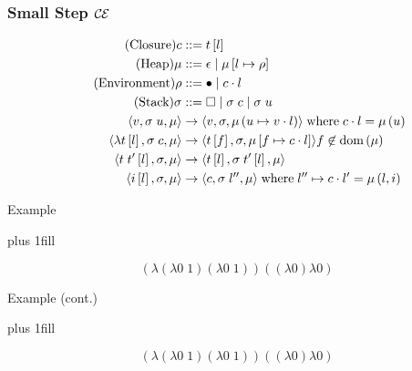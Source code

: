 \documentclass[14pt]{beamer}
\def\ce{$\mathcal{\mathcal{C} \mskip -1mu \mathcal{E}} \mskip 4mu$}
\begin{document}
\begin{frame}[fragile]
\frametitle{Small Step \ce}
\footnotesize
\begin{align*}
\tag{Closure} c &::= t \left[l\right] \\
\tag{Heap} \mu &::= \epsilon \; | \; \mu \left[ l \mapsto \rho \right] \\
\tag{Environment} \rho &::= \bullet \; | \; c \cdot l \\
\tag{Stack} \sigma &::= \square \; | \; \sigma \; c \;  | \; \sigma \; u \\
\langle v,  \sigma \; u , \mu \rangle 
  &\rightarrow
\langle v, \sigma, \mu\left(u \mapsto v \cdot l\right) \rangle  
\; \textnormal{where} \; c \cdot l = \mu\left(u\right) \\
\langle \lambda t\left[l\right], \sigma \; c, \mu \rangle 
  &\rightarrow
\langle t\left[f\right], \sigma, \mu\left[f \mapsto c \cdot l\right]\rangle f
\not \in \textnormal{dom}\left(\mu\right)  \\
\langle t \; t'\left[l\right], \sigma, \mu \rangle
  &\rightarrow
\langle t\left[l\right], \sigma \; t'\left[l\right], \mu \rangle \\
\langle i\left[l\right], \sigma, \mu \rangle
  &\rightarrow
\langle c, \sigma \; l'', \mu \rangle
\; \textnormal{where} \; l'' \mapsto c \cdot l' = \mu\left(l, i\right)
\end{align*}
\end{frame}

\begin{frame}{Example}
\begin{center}
\vskip0pt plus 1fill
\end{center}
$$(\lambda (\lambda 0 \; 1) (\lambda 0 \; 1))((\lambda 0) \lambda 0)$$
\end{frame}

\begin{frame}{Example (cont.)}
\begin{center}
\vskip0pt plus 1fill
\end{center}
$$(\lambda (\lambda 0 \; 1) (\lambda 0 \; 1))((\lambda 0) \lambda 0)$$
\end{frame}
\end{document}
